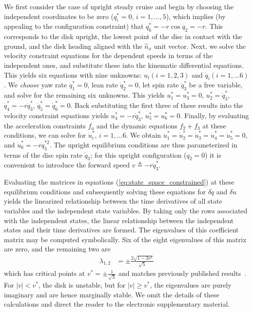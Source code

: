 We first consider the case of upright steady cruise and begin by choosing the
independent coordinates to be zero ($q_i^* = 0$, $i = 1,\dots,5$), which
implies (by appealing to the configuration constraint) that $q_6^* = -r
\cos{q_2} = -r$.  This corresponds to the disk upright, the lowest point of the
disc in contact with the ground, and the disk heading aligned with the
$\hat{n}_x$ unit vector.  Next, we solve the velocity constraint equations for
the dependent speeds in terms of the independent ones, and substitute these
into the kinematic differential equations. This yields six equations with nine
unknowns: $u_i (i=1,2,3)$ and $\dot{q}_i (i=1,\dots6)$. We \textit{choose} yaw
rate $\dot{q}_1^* = 0$, lean rate $\dot{q}_2^* = 0$, let spin rate
$\dot{q}_3^*$ be a free variable, and solve for the remaining six unknowns.
This yields $u_1^* = u_3^* = 0$, $u_2^* = \dot{q}_3^*$, $\dot{q}_4^* =
-r\dot{q}_3^*$, $\dot{q}_5^* = \dot{q}_6^* = 0$. Back substituting the first
three of these results into the velocity constraint equations yields $u_4^* =
-r\dot{q}_3^*$, $u_5^* = u_6^* = 0$. Finally, by evaluating the acceleration
constraints $f_a$ and the dynamic equations $f_2 + f_3$ at these conditions, we
can solve for $\dot{u}_i^*$, $i = 1,\dots6$. We obtain $\dot{u}_1^* =
\dot{u}_2^* = \dot{u}_3^* = \dot{u}_4^* = \dot{u}_5^* = 0$, and $\dot{u}_6^* =
-r \dot{q}_3^{*2}$. The upright equilibrium conditions are thus parameterized
in terms of the disc spin rate $\dot{q}_3$; for this upright configuration
($q_2 = 0$) it is convenient to introduce the forward speed $v \triangleq
-r\dot{q}_3^*$.

Evaluating the matrices in equations (\ref{eq:state_space_constrained}) at
these equilibrium conditions and subsequently solving these equations for
$\delta\dot{{q}}$ and $\delta\dot{{u}}$ yields the linearized
relationship between the time derivatives of all state variables and the
independent state variables. By taking only the rows associated with the
independent states, the linear relationship between the independent states and
their time derivatives are formed. The eigenvalues of this coefficient matrix
may be computed symbolically. Six of the eight eigenvalues of this matrix are
zero, and the remaining two are
\begin{align}
\label{eq:upright_evals}
  \lambda_{1,2} &= \pm \frac{2\sqrt{1 - 3v^2}}{\sqrt{5}}
\end{align}
which has critical points at $v^*=\pm\frac{1}{\sqrt{3}}$ and matches previously
published results~\cite{Schwab2003,Kane1985,Neimark1972}. For $|v| < v^*$,
the disk is unstable, but for $|v| \geq v^*$, the eigenvalues are purely
imaginary and are hence marginally stable. We omit the details of these
calculations and direct the reader to the electronic supplementary material.

